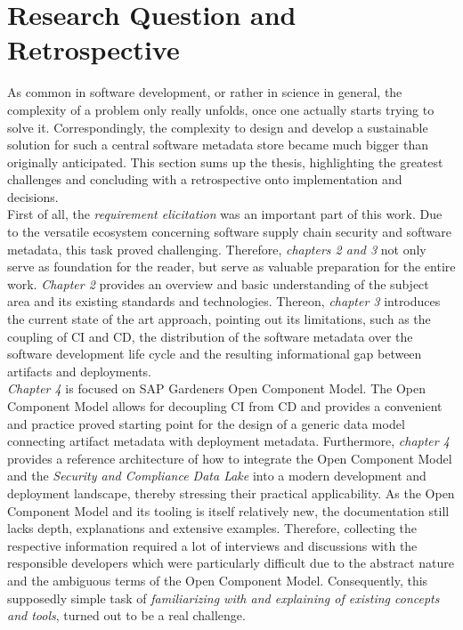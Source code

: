 \section{Research Question and Retrospective}
As common in software development, or rather in science in general, the complexity of a problem only really unfolds, once one actually starts trying to solve it. Correspondingly, the complexity to design and develop a sustainable solution for such a central software metadata store became much bigger than originally anticipated. This section sums up the thesis, highlighting the greatest challenges and concluding with a retrospective onto implementation and decisions.\\

First of all, the \emph{requirement elicitation} was an important part of this work. Due to the versatile ecosystem concerning software supply chain security and software metadata, this task proved challenging. Therefore, \emph{chapters 2 and 3} not only serve as foundation for the reader, but serve as valuable preparation for the entire work. \emph{Chapter 2} provides an overview and basic understanding of the subject area and its existing standards and technologies. Thereon, \emph{chapter 3} introduces the current state of the art approach, pointing out its limitations, such as the coupling of CI and CD, the distribution of the software metadata over the software development life cycle and the resulting informational gap between artifacts and deployments.\\

\emph{Chapter 4} is focused on SAP Gardeners Open Component Model. The Open Component Model allows for decoupling CI from CD and provides a convenient and practice proved starting point for the design of a generic data model connecting artifact metadata with deployment metadata. Furthermore, \emph{chapter 4} provides a reference architecture of how to integrate the Open Component Model and the \emph{Security and Compliance Data Lake} into a modern development and deployment landscape, thereby stressing their practical applicability. As the Open Component Model and its tooling is itself relatively new, the documentation still lacks depth, explanations and extensive examples. Therefore, collecting the respective information required a lot of interviews and discussions with the responsible developers which were particularly difficult due to the abstract nature and the ambiguous terms of the Open Component Model. Consequently, this supposedly simple task of \emph{familiarizing with and explaining of existing concepts and tools}, turned out to be a real challenge.\\


